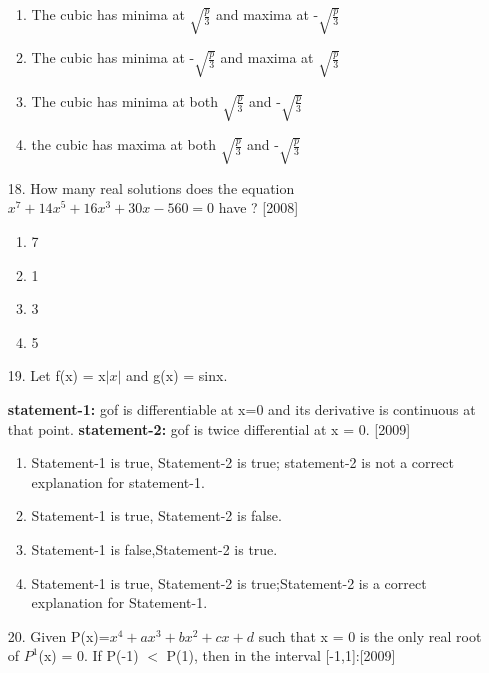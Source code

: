 \documentclass[journal,12pt,twocolumn]{IEEEtran}
\theoremstyle{remark}
\begin{document}
\begin{enumerate}
        \begin{enumerate}
        \item The cubic has minima at $\sqrt{\frac{p}{3}}$ and maxima at -$\sqrt{\frac{p}{3}}$
        \item The cubic has minima at -$\sqrt{\frac{p}{3}}$ and maxima at $\sqrt{\frac{p}{3}}$
        \item The cubic has minima at both $\sqrt{\frac{p}{3}}$ and -$\sqrt{\frac{p}{3}}$
        \item the cubic has maxima at both $\sqrt{\frac{p}{3}}$ and -$\sqrt{\frac{p}{3}}$
        
        \end{enumerate}
        \item[18.] How many real solutions does the equation $ x^7 + 14x^5 + 16x^3 + 30x- 560 = 0$ have ? \hfill[2008]
        \begin{enumerate}
            \item 7
        \item 1
        \item 3
        \item 5
        \end{enumerate}
        \item[19.] Let f(x) = x$\left |x\right|$ and g(x) = sinx.
        
    \textbf{statement-1:}  gof is differentiable at x=0 and its derivative is continuous at that point.
            \textbf{statement-2:  }gof is twice differential at x = 0. 
                 \hfill[2009] 
        
    
        \begin{enumerate}
            \item Statement-1 is true, Statement-2 is true; statement-2 is not a correct explanation for statement-1.
            
        \item Statement-1 is true, Statement-2 is false.
        \item Statement-1 is false,Statement-2 is true.
        \item Statement-1 is true, Statement-2 is true;Statement-2 is a correct explanation for Statement-1.
        \end{enumerate}
        \item[20.] Given P(x)=$x^4+ ax^3+bx^2+ cx+d$ such that x = 0 is the only real root of $P^1$(x) = 0. If P(-1) $<$ P(1), then in the interval [-1,1]:\hfill[2009]
        \begin{enumerate}
            

\end{enumerate}
\end{enumerate}
\end{document}
